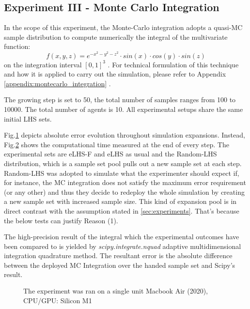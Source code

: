 \documentclass[12pt]{extarticle}
\newcommand{\mfigref}[1]{Fig.\ref{#1}}
\newcommand{\mappendixref}[1]{Appendix \ref{#1}}
\newcommand{\midcaption}[1]{
    \captionsetup{justification=centering}
    \caption{#1}
}
\begin{document}
\subsection{Experiment III - Monte Carlo Integration}
\label{subsec:exp3}
In the scope of this experiment, the Monte-Carlo integration adopts a quasi-MC sample distribution to compute numerically the integral of the multivariate function:
\begin{equation*}
f(x,y,z) = e^{-x^2-y^2-z^2} \cdot sin(x) \cdot cos(y) \cdot sin(z)
\end{equation*}
on the integration interval $[0, 1]^3$ .
For technical formulation of this technique and how it is applied to carry out the simulation, please refer to \mappendixref{appendix:montecarlo_integration} .

The growing step is set to 50, the total number of samples ranges from 100 to 10000. The total number of agents is 10. 
All experimental setups share the same initial LHS sets.

\mfigref{fig:exp3_error} depicts absolute error evolution throughout simulation expansions. Instead, \mfigref{fig:exp3_time} shows the computational time measured at the end of every step. The experimental sets are eLHS-F and eLHS as usual and the Random-LHS distribution, which is a sample set pool pulls out a new sample set at each step. Random-LHS was adopted to simulate what the experimenter should expect if, for instance, the MC integration does not satisfy the maximum error requirement (or any other) and thus they decide to redeploy the whole simulation by creating a new sample set with increased sample size. This kind of expansion pool is in direct contrast with the assumption stated in \cref{sec:experiments}. That's because the below tests can justify Reason (1). 

The high-precision result of the integral which the experimental outcomes have been compared to is yielded by \emph{scipy.integrate.nquad} adaptive multidimensional integration quadrature method. The resultant error is the absolute difference between the deployed MC Integration over the handed sample set and Scipy's result.

\begin{figure}[H]
    \centering
    \captionsetup{skip=0pt}
    \midcaption{}
    \label{fig:exp3_error}
\end{figure}
\begin{figure}[H]
    \centering
    \captionsetup{skip=0pt}
    \midcaption{The experiment was ran on a single unit Macbook Air (2020), CPU/GPU: Silicon M1}
    \label{fig:exp3_time}
\end{figure}
\end{document}
